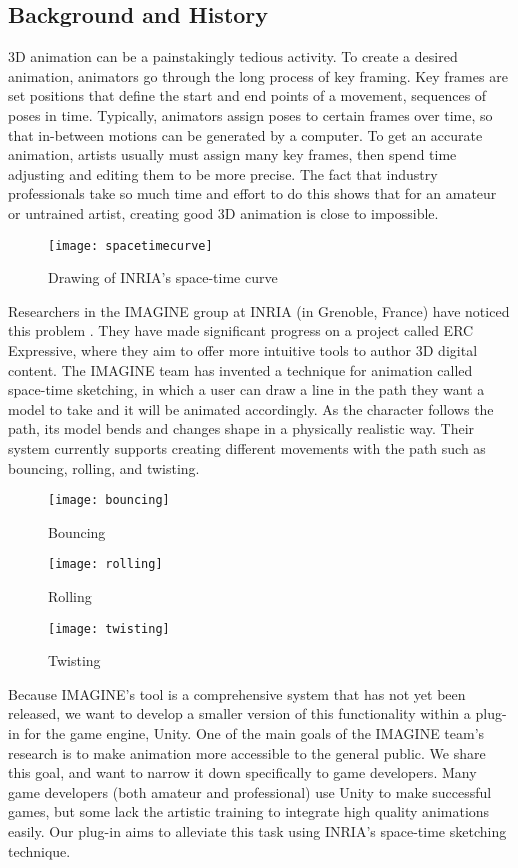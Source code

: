 \subsection{Background and History}
3D animation can be a painstakingly tedious activity. To create a desired animation, animators go through the long process of key framing. Key frames are set positions that define the start and end points of a movement, sequences of poses in time. Typically, animators assign poses to certain frames over time, so that in-between motions can be generated by a computer. To get an accurate animation, artists usually must assign many key frames, then spend time adjusting and editing them to be more precise. The fact that industry professionals take so much time and effort to do this shows that for an amateur or untrained artist, creating good 3D animation is close to impossible.

\begin{figure}[H]
\centering
\texttt{[image: spacetimecurve]}
\caption{Drawing of INRIA's space-time curve}
\label{fig:spaceTimeCurve}
\end{figure}

Researchers in the IMAGINE group at INRIA (in Grenoble, France) have noticed this problem \cite{hal}. They have made significant progress on a project called ERC Expressive, where they aim to offer more intuitive tools to author 3D digital content. The IMAGINE team has invented a technique for animation called space-time sketching, in which a user can draw a line in the path they want a model to take and it will be animated accordingly. As the character follows the path, its model bends and changes shape in a physically realistic way. Their system currently supports creating different movements with the path such as bouncing, rolling, and twisting.

\begin{figure}[!htb]
  \texttt{[image: bouncing]}
  \caption{Bouncing}\label{fig:bouncing}
\endminipage\hfill
{}
  \texttt{[image: rolling]}
  \caption{Rolling}\label{fig:rolling}
\endminipage\hfill
{}%
  \texttt{[image: twisting]}
  \caption{Twisting}\label{fig:twisting}
\endminipage
\end{figure}

Because IMAGINE's tool is a comprehensive system that has not yet been released, we want to develop a smaller version of this functionality within a plug-in for the game engine, Unity. One of the main goals of the IMAGINE team's research is to make animation more accessible to the general public. We share this goal, and want to narrow it down specifically to game developers. Many game developers (both amateur and professional) use Unity to make successful games, but some lack the artistic training to integrate high quality animations easily. Our plug-in aims to alleviate this task using INRIA's space-time sketching technique. 

